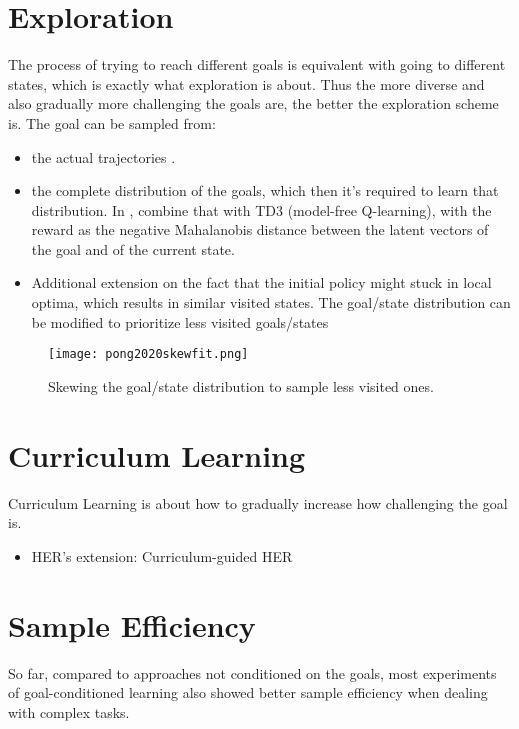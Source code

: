 \section{Exploration}
The process of trying to reach different goals is equivalent with going to different states, which is exactly what exploration is about. Thus the more diverse and also gradually more challenging the goals are, the better the exploration scheme is. The goal can be sampled from:
\begin{itemize}
	\item the actual trajectories \cite{andrychowicz2017hindsight}.
	\item the complete distribution of the goals, which then it's required to learn that distribution. In \cite{nair2018visual}, \citeauthor*{nair2018visual} combine that with TD3 \cite{fujimoto2018addressing} (model-free Q-learning), with the reward as the negative Mahalanobis distance between the latent vectors of the goal and of the current state.
	\item Additional extension on the fact that the initial policy might stuck in local optima, which results in similar visited states. The goal/state distribution can be modified to prioritize less visited goals/states \cite{pong2019skew}
\end{itemize}
\begin{figure}[hbt!]
	\centering
	\texttt{[image: pong2020skewfit.png]}
	\caption{Skewing the goal/state distribution to sample less visited ones. \cite{pong2019skew}}
\end{figure}

\section{Curriculum Learning}
Curriculum Learning is about how to gradually increase how challenging the goal is.
\begin{itemize}
	\item \ac{HER}'s extension: Curriculum-guided \ac{HER} \cite{fang2019curriculum}
\end{itemize}

\section{Sample Efficiency}
So far, compared to approaches not conditioned on the goals, most experiments of goal-conditioned learning also showed better sample efficiency when dealing with complex tasks. \cite{andrychowicz2017hindsight, nair2018visual}


